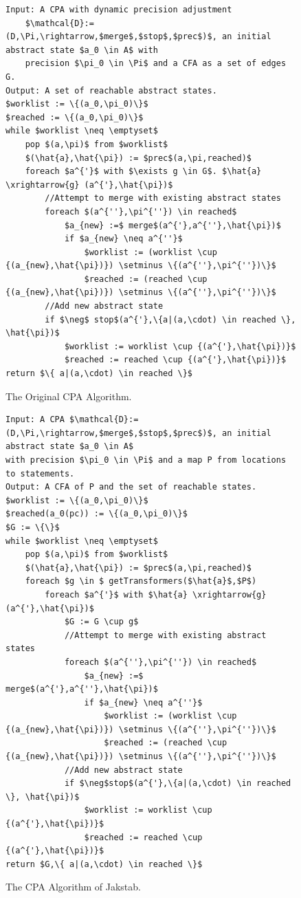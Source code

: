 \documentclass{kththesis}
\begin{document}
\begin{figure}[thb]
    \centering
\begin{lstlisting}[style=algorithm]
Input: A CPA with dynamic precision adjustment 
    $\mathcal{D}:=(D,\Pi,\rightarrow,$merge$,$stop$,$prec$)$, an initial abstract state $a_0 \in A$ with 
    precision $\pi_0 \in \Pi$ and a CFA as a set of edges G.
Output: A set of reachable abstract states.
$worklist := \{(a_0,\pi_0)\}$
$reached := \{(a_0,\pi_0)\}$
while $worklist \neq \emptyset$
    pop $(a,\pi)$ from $worklist$
    $(\hat{a},\hat{\pi}) := $prec$(a,\pi,reached)$
    foreach $a^{'}$ with $\exists g \in G$. $\hat{a} \xrightarrow{g} (a^{'},\hat{\pi})$
        //Attempt to merge with existing abstract states
        foreach $(a^{''},\pi^{''}) \in reached$
            $a_{new} :=$ merge$(a^{'},a^{''},\hat{\pi})$
            if $a_{new} \neq a^{''}$
                $worklist := (worklist \cup {(a_{new},\hat{\pi})}) \setminus \{(a^{''},\pi^{''})\}$
                $reached := (reached \cup {(a_{new},\hat{\pi})}) \setminus \{(a^{''},\pi^{''})\}$
        //Add new abstract state
        if $\neg$ stop$(a^{'},\{a|(a,\cdot) \in reached \}, \hat{\pi})$
            $worklist := worklist \cup {(a^{'},\hat{\pi})}$
            $reached := reached \cup {(a^{'},\hat{\pi})}$
return $\{ a|(a,\cdot) \in reached \}$
\end{lstlisting}
\caption[The original CPA Algorithm.]{The Original CPA Algorithm.}
    \label{fig:CPAOrig}
\end{figure}


\begin{figure}[thb]
    \centering
\begin{lstlisting}[style=algorithm]
Input: A CPA $\mathcal{D}:=(D,\Pi,\rightarrow,$merge$,$stop$,$prec$)$, an initial abstract state $a_0 \in A$ 
with precision $\pi_0 \in \Pi$ and a map P from locations to statements.
Output: A CFA of P and the set of reachable states.
$worklist := \{(a_0,\pi_0)\}$
$reached(a_0(pc)) := \{(a_0,\pi_0)\}$
$G := \{\}$
while $worklist \neq \emptyset$
    pop $(a,\pi)$ from $worklist$
    $(\hat{a},\hat{\pi}) := $prec$(a,\pi,reached)$
    foreach $g \in $ getTransformers($\hat{a}$,$P$)
        foreach $a^{'}$ with $\hat{a} \xrightarrow{g} (a^{'},\hat{\pi})$
            $G := G \cup g$
            //Attempt to merge with existing abstract states
            foreach $(a^{''},\pi^{''}) \in reached$
                $a_{new} :=$ merge$(a^{'},a^{''},\hat{\pi})$
                if $a_{new} \neq a^{''}$
                    $worklist := (worklist \cup {(a_{new},\hat{\pi})}) \setminus \{(a^{''},\pi^{''})\}$
                    $reached := (reached \cup {(a_{new},\hat{\pi})}) \setminus \{(a^{''},\pi^{''})\}$
            //Add new abstract state
            if $\neg$stop$(a^{'},\{a|(a,\cdot) \in reached \}, \hat{\pi})$
                $worklist := worklist \cup {(a^{'},\hat{\pi})}$
                $reached := reached \cup {(a^{'},\hat{\pi})}$
return $G,\{ a|(a,\cdot) \in reached \}$
\end{lstlisting}
\caption[The CPA Algorithm of Jakstab.]{The CPA Algorithm of Jakstab.}
    \label{fig:CPAJakstab}
\end{figure}
\end{document}
